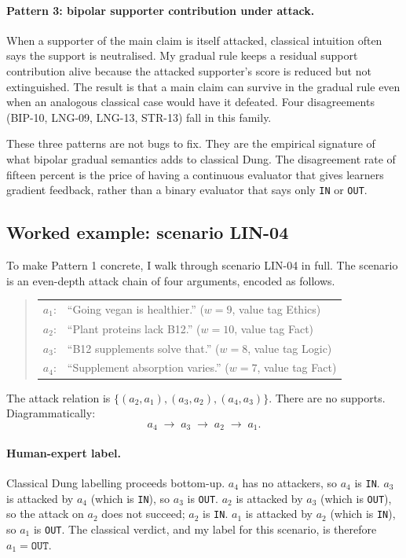 \paragraph{Pattern 3: bipolar supporter contribution under attack.}
When a supporter of the main claim is itself attacked, classical intuition often says the support is neutralised. My gradual rule keeps a residual support contribution alive because the attacked supporter's score is reduced but not extinguished. The result is that a main claim can survive in the gradual rule even when an analogous classical case would have it defeated. Four disagreements (BIP-10, LNG-09, LNG-13, STR-13) fall in this family.

These three patterns are not bugs to fix. They are the empirical signature of what bipolar gradual semantics adds to classical Dung. The disagreement rate of fifteen percent is the price of having a continuous evaluator that gives learners gradient feedback, rather than a binary evaluator that says only \texttt{IN} or \texttt{OUT}.

\subsection{Worked example: scenario LIN-04}
\label{sec:eval_lin04}
To make Pattern 1 concrete, I walk through scenario LIN-04 in full. The scenario is an even-depth attack chain of four arguments, encoded as follows.
\begin{quote}
\begin{tabular}{rl}
$a_1$: & ``Going vegan is healthier.'' \quad ($w=9$, value tag Ethics) \\
$a_2$: & ``Plant proteins lack B12.'' \quad ($w=10$, value tag Fact) \\
$a_3$: & ``B12 supplements solve that.'' \quad ($w=8$, value tag Logic) \\
$a_4$: & ``Supplement absorption varies.'' \quad ($w=7$, value tag Fact) \\
\end{tabular}
\end{quote}
\noindent The attack relation is $\{(a_2, a_1), (a_3, a_2), (a_4, a_3)\}$. There are no supports. Diagrammatically:
\[
    a_4 \;\longrightarrow\; a_3 \;\longrightarrow\; a_2 \;\longrightarrow\; a_1.
\]

\paragraph{Human-expert label.}
Classical Dung labelling proceeds bottom-up. $a_4$ has no attackers, so $a_4$ is \texttt{IN}. $a_3$ is attacked by $a_4$ (which is \texttt{IN}), so $a_3$ is \texttt{OUT}. $a_2$ is attacked by $a_3$ (which is \texttt{OUT}), so the attack on $a_2$ does not succeed; $a_2$ is \texttt{IN}. $a_1$ is attacked by $a_2$ (which is \texttt{IN}), so $a_1$ is \texttt{OUT}. The classical verdict, and my label for this scenario, is therefore $a_1 = \texttt{OUT}$.

